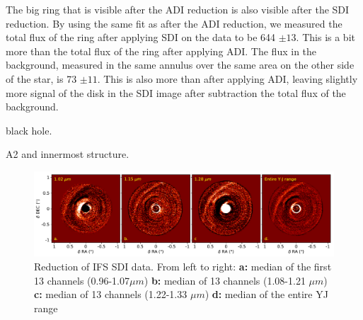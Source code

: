 \documentclass[twoside,single]{lion-msc}
\begin{document}
The big ring that is visible after the ADI reduction is also visible after the SDI reduction. By using the same fit as after the ADI reduction, we measured the total flux of the ring after applying SDI on the data to be 644 $\pm 13$. This is a bit more than the total flux of the ring after applying ADI. The flux in the background, measured in the same annulus over the same area on the other side of the star, is 73 $\pm 11$. This is also more than after applying ADI, leaving slightly more signal of the disk in the SDI image after subtraction the total flux of the background.  

black hole.

A2 and innermost structure.



\begin{figure}[htb]
\centering
\includegraphics[trim={0cm 0cm 0cm 0cm},clip,width = \textwidth]{SDIwavelplot}
\caption{Reduction of IFS SDI data. From left to right: \textbf{a:} median of the first 13 channels (0.96-1.07$\mu m$) \textbf{b:} median of 13 channels (1.08-1.21 $\mu m$) \textbf{c:} median of 13 channels (1.22-1.33 $\mu m$) \textbf{d:} median of the entire YJ range}
\label{fig:ADIcolor}
\end{figure}

\clearpage
\end{document}
